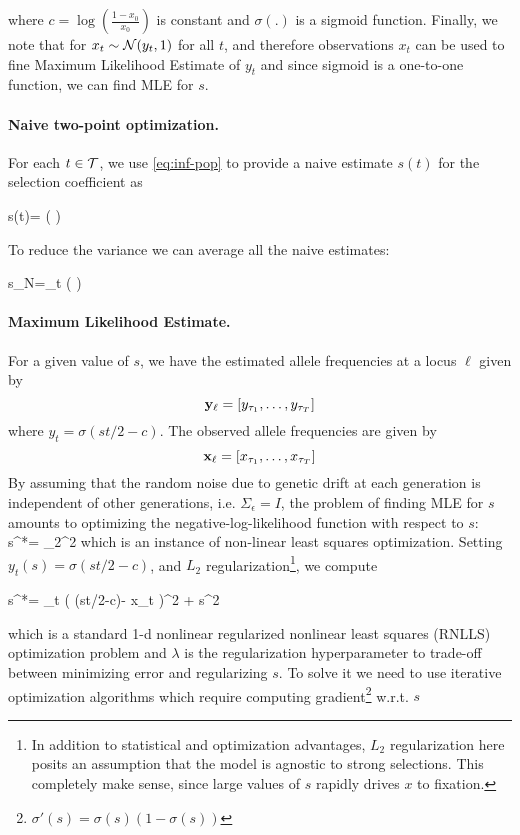 where $c=\log\left(\frac{1-x_0}{x_0}\right)$ is constant
\cite{multilocus-hitchhike} and $\sigma(.)$ is a sigmoid
function. Finally, we note that for $x_t\sim{\cal N}(y_t,1)$ for all $t$, 
and therefore observations $x_t$ can be used to fine Maximum Likelihood Estimate of $y_t$ and since sigmoid is a one-to-one function, we can find MLE for 
$s$.

\paragraph{Naive two-point optimization.} 
For each $t\in {\cal T}$, we use \eqref{eq:inf-pop} to provide a naive
estimate $s(t)$ for the selection coefficient as

\beq 
s(t)= \log \left(  \right) 
\eeq

To reduce the variance we can average all the naive estimates: 

\beq
s_{N}=\sum_{t\in \Tc} \log \left(  \right) 
\label{eq:naive}
\eeq


\paragraph{Maximum Likelihood Estimate.}
For a given value of $s$, we have the estimated allele frequencies at
a locus $\ell$ given by
\[
{\bf y_{\ell}} = [y_{\tau_1},\ldots,y_{\tau_T}]
\]
where $y_t=\sigma(st/2-c)$. The observed allele frequencies are
given by
\[
{\bf x_{\ell}} = [x_{\tau_1},\ldots,x_{\tau_T}]
\]
By assuming that the random noise due to genetic drift at each generation is independent of other generations, i.e. $\Sigma_\epsilon = I$, the problem of finding MLE for $s$ amounts to optimizing the negative-log-likelihood function with respect to $s$:
\beq \label{eq:nlls0}
s^*=   \parallel_2^2
\eeq
which is an instance of non-linear least squares optimization.
Setting $y_t(s)=\sigma(st/2-c)$, and $L_2$ regularization\footnote{In addition to statistical and optimization advantages, $L_2$ regularization here posits an assumption that the model is agnostic to strong selections. This completely make sense, since large values of $s$ rapidly drives $x$ to fixation.}, we compute

\beq
s^*=  \sum_{t\in \Tc} \left( \sigma(st/2-c)- x_{t} \right)^2 + s^2
\eeq

which is a standard 1-d nonlinear regularized nonlinear least squares
(RNLLS) optimization problem and $\lambda$ is the regularization hyperparameter to trade-off between minimizing error and regularizing $s$. To solve it we need to use iterative
optimization algorithms which require computing
gradient\footnote{$\sigma'(s)=\sigma(s)(1-\sigma(s))$} w.r.t. $s$

